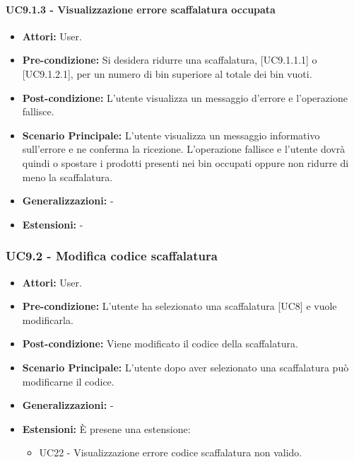 \paragraph{UC9.1.3 - Visualizzazione errore scaffalatura occupata}
\begin{itemize}
    \item \textbf{Attori:} User.
    \item \textbf{Pre-condizione:} Si desidera ridurre una scaffalatura, [UC9.1.1.1] o [UC9.1.2.1], per un numero di bin superiore al totale dei bin vuoti.
    \item \textbf{Post-condizione:} L'utente visualizza un messaggio d'errore e l'operazione fallisce.
    \item \textbf{Scenario Principale:} L'utente visualizza un messaggio informativo sull'errore e ne conferma la ricezione. L'operazione fallisce e l'utente dovrà quindi o spostare i prodotti presenti nei bin occupati oppure non ridurre di meno la scaffalatura.
    \item \textbf{Generalizzazioni:} -
    \item \textbf{Estensioni:} -
\end{itemize}


\subsubsection{UC9.2 - Modifica codice scaffalatura}
\begin{itemize}
    \item \textbf{Attori:} User.
    \item \textbf{Pre-condizione:} L'utente ha selezionato una scaffalatura [UC8] e vuole modificarla.
    \item \textbf{Post-condizione:} Viene modificato il codice della scaffalatura.
    \item \textbf{Scenario Principale:} L'utente dopo aver selezionato una scaffalatura può modificarne il codice.
    \item \textbf{Generalizzazioni:} -
    \item \textbf{Estensioni:} È presene una estensione:
    \begin{itemize}
        \item UC22 - Visualizzazione errore codice scaffalatura non valido.
    \end{itemize}
\end{itemize}


